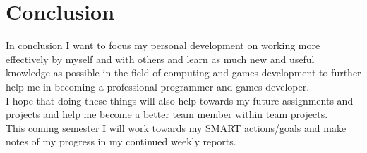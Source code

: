 \documentclass{scrartcl}
\begin{document}
\section{Conclusion}

In conclusion I want to focus my personal development on working more effectively by myself and with others and learn as much new and useful knowledge as possible in the field of computing and games development to further help me in becoming a professional programmer and games developer.
\\
I hope that doing these things will also help towards my future assignments and projects and help me become a better team member within team projects.
\\
This coming semester I will work towards my SMART actions/goals and make notes of my progress in my continued weekly reports.



\end{document}
